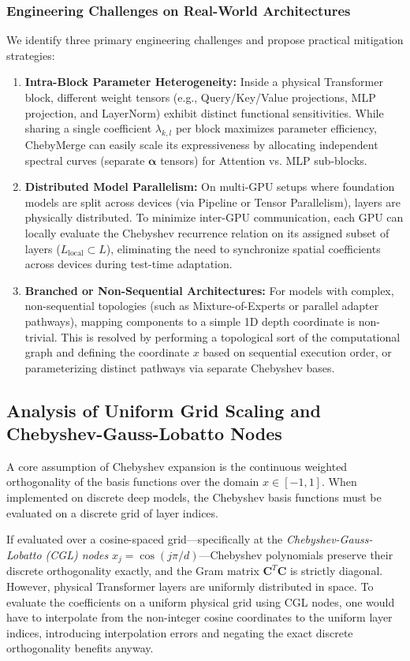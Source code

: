 \documentclass{article}
\theoremstyle{plain}
\theoremstyle{definition}
\theoremstyle{remark}
\begin{document}
\subsubsection{Engineering Challenges on Real-World Architectures}
We identify three primary engineering challenges and propose practical mitigation strategies:
\begin{enumerate}
    \item \textbf{Intra-Block Parameter Heterogeneity:} Inside a physical Transformer block, different weight tensors (e.g., Query/Key/Value projections, MLP projection, and LayerNorm) exhibit distinct functional sensitivities. While sharing a single coefficient $\lambda_{k, l}$ per block maximizes parameter efficiency, ChebyMerge can easily scale its expressiveness by allocating independent spectral curves (separate $\boldsymbol{\alpha}$ tensors) for Attention vs. MLP sub-blocks.
    \item \textbf{Distributed Model Parallelism:} On multi-GPU setups where foundation models are split across devices (via Pipeline or Tensor Parallelism), layers are physically distributed. To minimize inter-GPU communication, each GPU can locally evaluate the Chebyshev recurrence relation on its assigned subset of layers ($L_{\text{local}} \subset L$), eliminating the need to synchronize spatial coefficients across devices during test-time adaptation.
    \item \textbf{Branched or Non-Sequential Architectures:} \label{sec:complex_topologies} For models with complex, non-sequential topologies (such as Mixture-of-Experts or parallel adapter pathways), mapping components to a simple 1D depth coordinate is non-trivial. This is resolved by performing a topological sort of the computational graph and defining the coordinate $x$ based on sequential execution order, or parameterizing distinct pathways via separate Chebyshev bases.
\end{enumerate}

\subsection{Analysis of Uniform Grid Scaling and Chebyshev-Gauss-Lobatto Nodes}
A core assumption of Chebyshev expansion is the continuous weighted orthogonality of the basis functions over the domain $x \in [-1, 1]$. When implemented on discrete deep models, the Chebyshev basis functions must be evaluated on a discrete grid of layer indices. 

If evaluated over a cosine-spaced grid—specifically at the \emph{Chebyshev-Gauss-Lobatto (CGL) nodes} $x_j = \cos(j\pi / d)$—Chebyshev polynomials preserve their discrete orthogonality exactly, and the Gram matrix $\mathbf{C}^T \mathbf{C}$ is strictly diagonal. However, physical Transformer layers are uniformly distributed in space. To evaluate the coefficients on a uniform physical grid using CGL nodes, one would have to interpolate from the non-integer cosine coordinates to the uniform layer indices, introducing interpolation errors and negating the exact discrete orthogonality benefits anyway.
\end{document}
